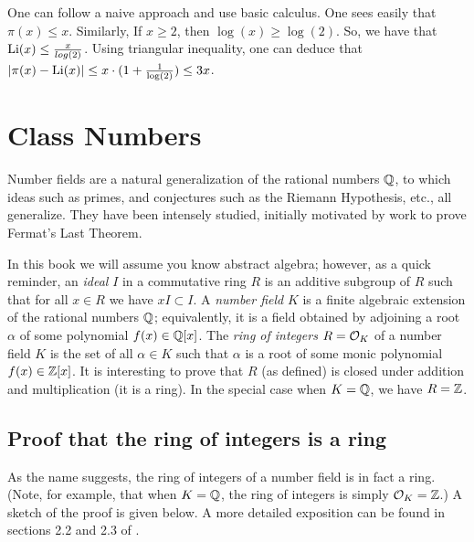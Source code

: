 \documentclass{book}
\begin{document}

One can follow a naive approach and use basic calculus.
One sees easily that $\pi(x) \leq x$. Similarly, If $x \geq 2$, then $\log(x) \geq \log(2)$. So, we have that $\operatorname{Li}(x) \leq \frac{x}{log(2)} $.
Using triangular inequality, one can deduce that $|\pi(x)-\operatorname{Li}(x)| \leq x \cdot (1 + \frac{1}{\log(2)}) \leq 3x$.


\section{Class Numbers}
Number fields are a natural generalization of the rational numbers $\mathbb{Q}$,
to which ideas such as primes, and conjectures such as
the Riemann Hypothesis, etc., all generalize.  They have
been intensely studied, initially motivated by
work to prove Fermat's Last Theorem.

In this book we will assume you know abstract algebra; however,
as a quick reminder, an {\em ideal} $I$ in a commutative ring $R$ is an
additive subgroup of $R$ such that for all $x\in R$ we have $xI \subset I$.
A {\em number field} $K$ is a finite algebraic extension of
the rational numbers $\mathbb{Q}$; equivalently, it is a field obtained
by adjoining a root $\alpha$ of some polynomial $f(x) \in \mathbb{Q}[x]$.
The {\em ring of integers} $R=\mathcal{O}_K$ of a number field $K$ is the
set of all $\alpha\in K$ such that $\alpha$ is a root of some
monic polynomial $f(x)\in\mathbb{Z}[x]$.  It is interesting to prove
that $R$ (as defined) is closed under addition and multiplication
(it is a ring).
In the special case when $K=\mathbb{Q}$, we have $R=\mathbb{Z}$.

\subsection{Proof that the ring of integers is a ring}
As the name suggests, the ring
of integers of a number field is in fact a ring.
(Note, for example, that when $K = \mathbb{Q}$, the ring of integers is simply
$\mathcal{O}_K = \mathbb{Z}$.)
A sketch of the proof is given below.
A more detailed
exposition can be found in sections 2.2 and 2.3 of \cite{stein:ant}.
\end{document}

